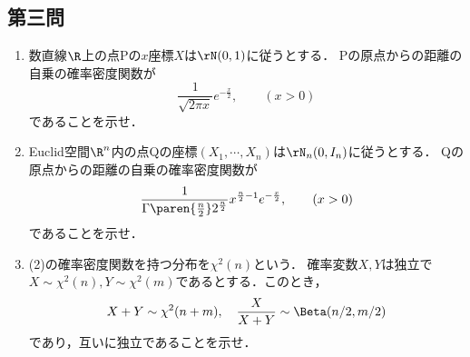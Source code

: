 \documentclass[uplatex,dvipdfmx]{jsarticle}
\begin{document}
\subsection{第三問}

\begin{tcolorbox}[colframe=ForestGreen, colback=ForestGreen!10!white,breakable,colbacktitle=ForestGreen!40!white,coltitle=black,fonttitle=\bfseries\sffamily,
    title=第３問]
    \begin{problem}\mbox{}\label{prob-18-8-3}
        \begin{enumerate}[{問}1]
            \item 数直線$\R$上の点Pの$x$座標$X$は$\rN(0,1)$に従うとする．
            Pの原点からの距離の自乗の確率密度関数が
            \[\frac{1}{\sqrt{2\pi x}}e^{-\frac{x}{2}},\qquad(x>0)\]
            であることを示せ．
            \item Euclid空間$\R^n$内の点Qの座標$(X_1,\cdots,X_n)$は$\rN_n(0,I_n)$に従うとする．
            Qの原点からの距離の自乗の確率密度関数が
            \[\frac{1}{\Gamma\paren{\frac{n}{2}}2^{\frac{n}{2}}}x^{\frac{n}{2}-1}e^{-\frac{x}{2}},\qquad(x>0)\]
            であることを示せ．
            \item (2)の確率密度関数を持つ分布を$\chi^2(n)$という．
            確率変数$X,Y$は独立で$X\sim\chi^2(n),Y\sim\chi^2(m)$であるとする．このとき，
            \[X+Y\sim\chi^2(n+m),\quad\frac{X}{X+Y}\sim\Beta(n/2,m/2)\]
            であり，互いに独立であることを示せ．
        \end{enumerate}
    \end{problem}
\end{tcolorbox}
\end{document}
